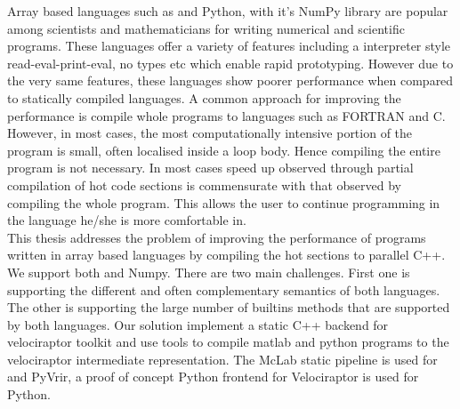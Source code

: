 Array based languages such as \matlab \cite{matlab} and Python, with it's NumPy library are popular among scientists and mathematicians for writing   numerical and scientific programs. These languages offer a variety of features including a interpreter style read-eval-print-eval, no types etc which enable rapid prototyping. However due to the very same features, these languages show poorer performance when compared to statically compiled languages. A common approach for improving the performance is compile whole programs to languages such as {\sc FORTRAN} and C. However, in most cases, the most computationally intensive portion of the program is small, often localised inside a loop body. Hence compiling the entire program is not necessary. In most cases speed up observed through partial compilation of hot code sections is commensurate with that observed by compiling the whole program. This allows the user to continue programming in the language he/she is more comfortable in.\\

This thesis addresses the problem of improving the performance of programs written in array based languages by compiling the hot sections to parallel C++. We support both \matlab and Numpy. There are two main challenges. First one is supporting the different and often complementary semantics of both languages. The other is supporting the large number of builtins methods that are supported by both languages.
Our solution implement a static C++ backend for velociraptor toolkit and use tools to compile matlab and python programs to the velociraptor intermediate representation. The McLab static pipeline is used for \matlab and PyVrir, a proof of concept Python frontend for Velociraptor is used for Python. 

